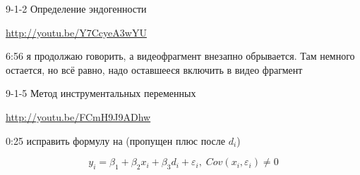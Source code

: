 \documentclass[12pt,a4paper]{article}
\newcommand{\e}{\varepsilon}
\begin{document}
9-1-2 Определение эндогенности

\url{http://youtu.be/Y7CcyeA3wYU}

6:56 я продолжаю говорить, а видеофрагмент внезапно обрывается. Там немного остается, но всё равно, надо оставшееся включить в видео фрагмент

9-1-5 Метод инструментальных переменных

\url{http://youtu.be/FCmH9J9ADhw}

0:25 исправить формулу на (пропущен плюс после $d_i$)

\[
y_i=\beta_1 + \beta_2 x_i + \beta_3 d_i + \e_i, \; Cov(x_i,\e_i)\neq 0
\]
\end{document}
